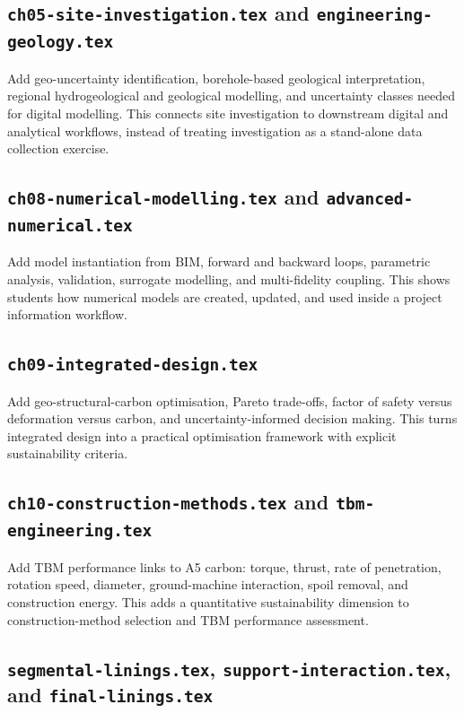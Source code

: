 \documentclass[11pt]{article}
\begin{document}
\subsection*{\texttt{ch05-site-investigation.tex} and \texttt{engineering-geology.tex}}

Add geo-uncertainty identification, borehole-based geological interpretation,
regional hydrogeological and geological modelling, and uncertainty classes
needed for digital modelling. This connects site investigation to downstream
digital and analytical workflows, instead of treating investigation as a
stand-alone data collection exercise.

\subsection*{\texttt{ch08-numerical-modelling.tex} and \texttt{advanced-numerical.tex}}

Add model instantiation from BIM, forward and backward loops, parametric
analysis, validation, surrogate modelling, and multi-fidelity coupling. This
shows students how numerical models are created, updated, and used inside a
project information workflow.

\subsection*{\texttt{ch09-integrated-design.tex}}

Add geo-structural-carbon optimisation, Pareto trade-offs, factor of safety
versus deformation versus carbon, and uncertainty-informed decision making.
This turns integrated design into a practical optimisation framework with
explicit sustainability criteria.

\subsection*{\texttt{ch10-construction-methods.tex} and \texttt{tbm-engineering.tex}}

Add TBM performance links to A5 carbon: torque, thrust, rate of penetration,
rotation speed, diameter, ground-machine interaction, spoil removal, and
construction energy. This adds a quantitative sustainability dimension to
construction-method selection and TBM performance assessment.

\subsection*{\texttt{segmental-linings.tex}, \texttt{support-interaction.tex}, and \texttt{final-linings.tex}}
\end{document}
